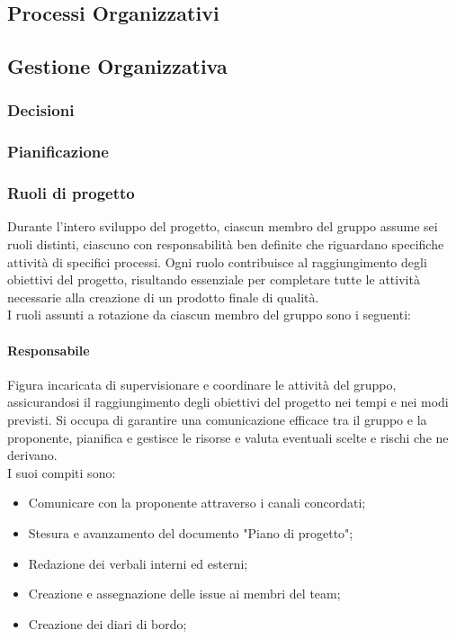 \documentclass[10pt]{article}
\begin{document}
\begin{justify}
\newpage
\section{Processi Organizzativi}
    \subsection{Gestione Organizzativa}

    \subsubsection{Decisioni}

    \subsubsection{Pianificazione}

    \subsubsection{Ruoli di progetto}
    Durante l'intero sviluppo del progetto, ciascun membro del gruppo assume sei ruoli distinti, ciascuno con responsabilità ben definite che riguardano specifiche attività di specifici processi.
    Ogni ruolo contribuisce al raggiungimento degli obiettivi del progetto, risultando essenziale per completare tutte le attività necessarie alla creazione di un prodotto finale di qualità.\\
    I ruoli assunti a rotazione da ciascun membro del gruppo sono i seguenti:
    
        \paragraph{Responsabile}
        Figura incaricata di supervisionare e coordinare le attività del gruppo, assicurandosi il raggiungimento degli obiettivi del progetto nei tempi e nei modi previsti. Si occupa di garantire una comunicazione efficace tra il gruppo e la proponente, pianifica e gestisce le risorse e valuta eventuali scelte e rischi che ne derivano.\\
        I suoi compiti sono:
        \begin{itemize}
            \item Comunicare con la proponente attraverso i canali concordati;
            \item Stesura e avanzamento del documento "Piano di progetto";
            \item Redazione dei verbali interni ed esterni;
            \item Creazione e assegnazione delle issue ai membri del team;
            \item Creazione dei diari di bordo;
        \end{itemize}


\end{justify}
\end{document}
